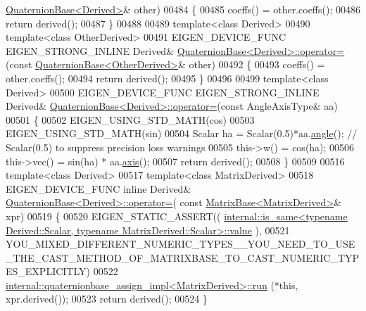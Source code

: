 \begin{DoxyCode}
      \hyperlink{group___geometry___module_class_eigen_1_1_quaternion_base}{QuaternionBase<Derived>}& other)
00484 \{
00485   coeffs() = other.coeffs();
00486   \textcolor{keywordflow}{return} derived();
00487 \}
00488 
00489 \textcolor{keyword}{template}<\textcolor{keyword}{class} Derived>
00490 \textcolor{keyword}{template}<\textcolor{keyword}{class} OtherDerived>
00491 EIGEN\_DEVICE\_FUNC EIGEN\_STRONG\_INLINE Derived& 
      \hyperlink{group___geometry___module_class_eigen_1_1_quaternion_base}{QuaternionBase<Derived>::operator=}(\textcolor{keyword}{const} 
      \hyperlink{group___geometry___module_class_eigen_1_1_quaternion_base}{QuaternionBase<OtherDerived>}& other)
00492 \{
00493   coeffs() = other.coeffs();
00494   \textcolor{keywordflow}{return} derived();
00495 \}
00496 
00499 \textcolor{keyword}{template}<\textcolor{keyword}{class} Derived>
00500 EIGEN\_DEVICE\_FUNC EIGEN\_STRONG\_INLINE Derived& 
      \hyperlink{group___geometry___module_class_eigen_1_1_quaternion_base}{QuaternionBase<Derived>::operator=}(\textcolor{keyword}{const} AngleAxisType& aa)
00501 \{
00502   EIGEN\_USING\_STD\_MATH(cos)
00503   EIGEN\_USING\_STD\_MATH(sin)
00504   Scalar ha = Scalar(0.5)*aa.\hyperlink{group___geometry___module_a83d3c08a73c111550b7e480d3ed043d4}{angle}(); \textcolor{comment}{// Scalar(0.5) to suppress precision loss warnings}
00505   this->w() = cos(ha);
00506   this->vec() = sin(ha) * aa.\hyperlink{group___geometry___module_ae40cc36c8dcd9977e1540d91a80696bb}{axis}();
00507   \textcolor{keywordflow}{return} derived();
00508 \}
00509 
00516 \textcolor{keyword}{template}<\textcolor{keyword}{class} Derived>
00517 \textcolor{keyword}{template}<\textcolor{keyword}{class} MatrixDerived>
00518 EIGEN\_DEVICE\_FUNC \textcolor{keyword}{inline} Derived& \hyperlink{group___geometry___module_class_eigen_1_1_quaternion_base}{QuaternionBase<Derived>::operator=}(\textcolor{keyword}{
      const} \hyperlink{group___core___module_class_eigen_1_1_matrix_base}{MatrixBase<MatrixDerived>}& xpr)
00519 \{
00520   EIGEN\_STATIC\_ASSERT((
      \hyperlink{struct_eigen_1_1internal_1_1is__same}{internal::is\_same<typename Derived::Scalar, typename MatrixDerived::Scalar>::value}
      ),
00521    
      YOU\_MIXED\_DIFFERENT\_NUMERIC\_TYPES\_\_YOU\_NEED\_TO\_USE\_THE\_CAST\_METHOD\_OF\_MATRIXBASE\_TO\_CAST\_NUMERIC\_TYPES\_EXPLICITLY)
00522   \hyperlink{struct_eigen_1_1internal_1_1quaternionbase__assign__impl}{internal::quaternionbase\_assign\_impl<MatrixDerived>::run}
      (*\textcolor{keyword}{this}, xpr.derived());
00523   \textcolor{keywordflow}{return} derived();
00524 \}

\end{DoxyCode}
